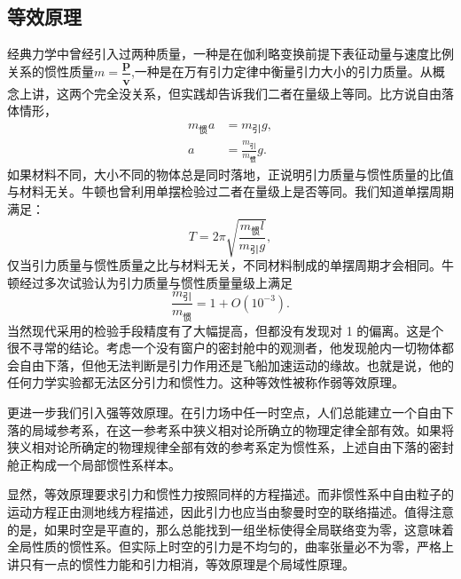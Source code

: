\documentclass[11pt, a4paper, oneside, onecolumn]{ctexart}
\numberwithin{equation}{subsection}
\begin{document}
\subsection{等效原理}
经典力学中曾经引入过两种质量，一种是在伽利略变换前提下表征动量与速度比例关系的惯性质量$m=\dfrac{\boldsymbol{p}}{\boldsymbol{v}}$,一种是在万有引力定律中衡量引力大小的引力质量。从概念上讲，这两个完全没关系，但实践却告诉我们二者在量级上等同。比方说自由落体情形，
\begin{align}
m_{\text{惯}}a&=m_{\text{引}}g,\\
a&=\frac{m_{\text{引}}}{m_{\text{惯}}}g.
\end{align}
如果材料不同，大小不同的物体总是同时落地，正说明引力质量与惯性质量的比值与材料无关。牛顿也曾利用单摆检验过二者在量级上是否等同。我们知道单摆周期满足：
\begin{equation}
T=2\pi\sqrt{\frac{m_{\text{惯}}l}{m_{\text{引}}g}},
\end{equation}
仅当引力质量与惯性质量之比与材料无关，不同材料制成的单摆周期才会相同。牛顿经过多次试验认为引力质量与惯性质量量级上满足
\begin{equation}
\frac{m_{\text{引}}}{m_{\text{惯}}}=1+O\left(10^{-3}\right).
\end{equation}
当然现代采用的检验手段精度有了大幅提高，但都没有发现对 1 的偏离。这是个很不寻常的结论。考虑一个没有窗户的密封舱中的观测者，他发现舱内一切物体都会自由下落，但他无法判断是引力作用还是飞船加速运动的缘故。也就是说，他的任何力学实验都无法区分引力和惯性力。这种等效性被称作弱等效原理。

更进一步我们引入强等效原理。在引力场中任一时空点，人们总能建立一个自由下落的局域参考系，在这一参考系中狭义相对论所确立的物理定律全部有效。如果将狭义相对论所确定的物理规律全部有效的参考系定为惯性系，上述自由下落的密封舱正构成一个局部惯性系样本。

显然，等效原理要求引力和惯性力按照同样的方程描述。而非惯性系中自由粒子的运动方程正由测地线方程描述，因此引力也应当由黎曼时空的联络描述。值得注意的是，如果时空是平直的，那么总能找到一组坐标使得全局联络变为零，这意味着全局性质的惯性系。但实际上时空的引力是不均匀的，曲率张量必不为零，严格上讲只有一点的惯性力能和引力相消，等效原理是个局域性原理。
\end{document}
